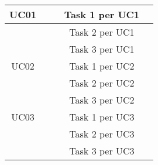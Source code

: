 \documentclass{article}
\begin{document}
\begin{itemize}
\begin{tabular}{ |c|c|c|c|c| }
            \hline
            UC01           &                     &               &   Task 1 per UC1   &               \\
            \hline
            &                     &               &   Task 2 per UC1   &               \\
            \hline
            &                     &               &   Task 3 per UC1   &               \\
            \hline
            UC02           &                     &               &   Task 1 per UC2   &               \\
            \hline
            &                     &               &   Task 2 per UC2   &               \\
            \hline
            &                     &               &   Task 3 per UC2   &               \\
            \hline
            UC03           &                     &               &   Task 1 per UC3   &               \\
            \hline
            &                     &               &   Task 2 per UC3   &               \\
            \hline
            &                     &               &   Task 3 per UC3   &               \\
            \hline
        \end{tabular}
    \end{itemize}
\end{document}
